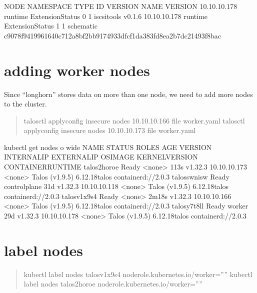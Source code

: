 \documentclass[letterpaper,10pt,english]{sphinxmanual}
\begin{document}
\sphinxAtStartPar
NODE           NAMESPACE   TYPE              ID   VERSION   NAME          VERSION
10.10.10.178   runtime     ExtensionStatus   0    1         iscsi\sphinxhyphen{}tools   v0.1.6
10.10.10.178   runtime     ExtensionStatus   1    1         schematic     c9078f9419961640c712a8bf2bb9174933dfcf1da383fd8ea2b7dc21493f8bac


\section{adding worker nodes}
\label{\detokenize{talos:adding-worker-nodes}}
\sphinxAtStartPar
Since “longhorn” stores data on more than one node, we need to add more nodes to the cluster.
\begin{quote}

\sphinxAtStartPar
talosctl apply\sphinxhyphen{}config \textendash{}insecure \textendash{}nodes 10.10.10.166 \textendash{}file worker.yaml
talosctl apply\sphinxhyphen{}config \textendash{}insecure \textendash{}nodes 10.10.10.173 \textendash{}file worker.yaml
\end{quote}

\sphinxAtStartPar
kubectl get nodes \sphinxhyphen{}o wide
NAME            STATUS   ROLES           AGE     VERSION   INTERNAL\sphinxhyphen{}IP    EXTERNAL\sphinxhyphen{}IP   OS\sphinxhyphen{}IMAGE         KERNEL\sphinxhyphen{}VERSION   CONTAINER\sphinxhyphen{}RUNTIME
talos\sphinxhyphen{}2ho\sphinxhyphen{}roe   Ready    \textless{}none\textgreater{}          113s    v1.32.3   10.10.10.173   \textless{}none\textgreater{}        Talos (v1.9.5)   6.12.18\sphinxhyphen{}talos    containerd://2.0.3
talos\sphinxhyphen{}swn\sphinxhyphen{}isw   Ready    control\sphinxhyphen{}plane   31d     v1.32.3   10.10.10.118   \textless{}none\textgreater{}        Talos (v1.9.5)   6.12.18\sphinxhyphen{}talos    containerd://2.0.3
talos\sphinxhyphen{}v1x\sphinxhyphen{}9s4   Ready    \textless{}none\textgreater{}          2m18s   v1.32.3   10.10.10.166   \textless{}none\textgreater{}        Talos (v1.9.5)   6.12.18\sphinxhyphen{}talos    containerd://2.0.3
talos\sphinxhyphen{}y7t\sphinxhyphen{}8ll   Ready    worker          29d     v1.32.3   10.10.10.178   \textless{}none\textgreater{}        Talos (v1.9.5)   6.12.18\sphinxhyphen{}talos    containerd://2.0.3


\section{label nodes}
\label{\detokenize{talos:label-nodes}}\begin{quote}

\sphinxAtStartPar
kubectl label nodes talos\sphinxhyphen{}v1x\sphinxhyphen{}9s4 node\sphinxhyphen{}role.kubernetes.io/worker=””
kubectl label nodes talos\sphinxhyphen{}2ho\sphinxhyphen{}roe node\sphinxhyphen{}role.kubernetes.io/worker=””
\end{quote}
\end{document}
